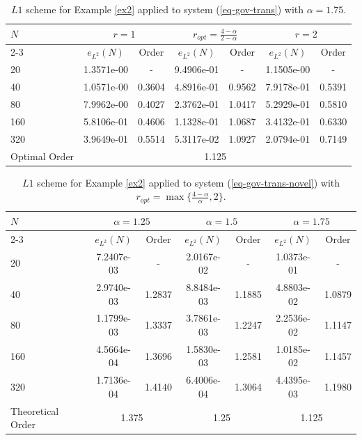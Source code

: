 \documentclass[11pt]{article}
\numberwithin{equation}{section}
\begin{document}
\begin{table}[!ht]
\caption{$L1$ scheme for Example \ref{ex2} applied to system (\ref{eq-gov-trans}) with $\alpha=1.75$.}\label{table6}
\renewcommand{\arraystretch}{1}
\def\temptablewidth{0.95\textwidth}
\begin{center}
 \begin{tabular*}{\temptablewidth}{@{\extracolsep{\fill}}lcccccc}\hline
 $N$ &\multicolumn{2}{c}{$r=1$} &\multicolumn{2}{c}{$r_{opt}=\frac{4-\alpha}{2-\alpha}$} &\multicolumn{2}{c}{$r=2$}    \\
 \cline{2-3}\cline{4-5}\cline{6-7}
 & $e_{L^{2}}(N)$         &Order     &$e_{L^{2}}(N)$    &Order    &$e_{L^{2}}(N)$ &Order     \\ \hline
 20 &1.3571e-00     &-       &9.4906e-01   &-        &1.1505e-00  &-  \\
 40 &1.0571e-00     &0.3604  &4.8916e-01   &0.9562   &7.9178e-01  &0.5391    \\
 80 &7.9962e-00     &0.4027  &2.3762e-01   &1.0417   &5.2929e-01  &0.5810 \\
 160 &5.8106e-01    &0.4606  &1.1328e-01   &1.0687   &3.4132e-01  &0.6330    \\
 320 &3.9649e-01    &0.5514  &5.3117e-02   &1.0927   &2.0794e-01  &0.7149    \\\hline
 Optimal Order  &\multicolumn{6}{c}{1.125} \\ \hline
\end{tabular*}
\end{center}
\end{table}


\begin{table}[!ht]
\caption{$L1$ scheme for Example \ref{ex2} applied to system (\ref{eq-gov-trans-novel}) with $r_{opt} =\max\{\frac{4-\alpha}{\alpha},2\}$.}\label{table7}
\renewcommand{\arraystretch}{1}
\def\temptablewidth{0.95\textwidth}
\begin{center}
 \begin{tabular*}{\temptablewidth}{@{\extracolsep{\fill}}lcccccc}\hline
 $N$  &\multicolumn{2}{c}{$\alpha=1.25$} &\multicolumn{2}{c}{$\alpha=1.5$} &\multicolumn{2}{c}{$\alpha=1.75$}\\
 \cline{2-3}\cline{4-5}\cline{6-7}
 & $e_{L^{2}}(N)$         &Order     &$e_{L^{2}}(N)$    &Order    &$e_{L^{2}}(N)$ &Order     \\ \hline   
 20  &7.2407e-03   &-       &2.0167e-02   &-        &1.0373e-01  &-  \\
 40  &2.9740e-03   &1.2837  &8.8484e-03   &1.1885   &4.8803e-02  &1.0879    \\
 80  &1.1799e-03   &1.3337  &3.7861e-03   &1.2247   &2.2536e-02  &1.1147 \\
 160 &4.5664e-04   &1.3696  &1.5830e-03   &1.2581   &1.0185e-02  &1.1457    \\
 320 &1.7136e-04   &1.4140  &6.4006e-04   &1.3064   &4.4395e-03  &1.1980  \\\hline
 Theoretical Order
 &\multicolumn{2}{c}{1.375} &\multicolumn{2}{c}{1.25}&\multicolumn{2}{c}{1.125}\\ \hline
\end{tabular*}
\end{center}
\end{table}
\end{document}
